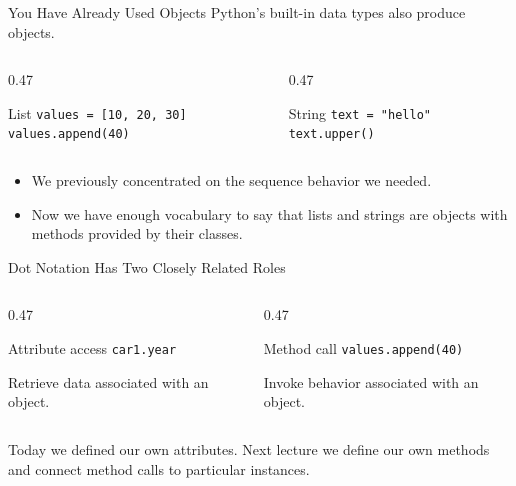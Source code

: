 \documentclass[aspectratio=169,10pt]{beamer}
\begin{document}

\begin{frame}{You Have Already Used Objects}
  Python's built-in data types also produce objects.

  \begin{columns}[T,onlytextwidth]
    \begin{column}{0.47\textwidth}
      \begin{block}{List}
        \texttt{values = [10, 20, 30]}\\
        \texttt{values.append(40)}
      \end{block}
    \end{column}
    \begin{column}{0.47\textwidth}
      \begin{block}{String}
        \texttt{text = "hello"}\\
        \texttt{text.upper()}
      \end{block}
    \end{column}
  \end{columns}

  \begin{itemize}
    \item We previously concentrated on the sequence behavior we needed.
    \item Now we have enough vocabulary to say that lists and strings are objects with methods provided by their classes.
  \end{itemize}
\end{frame}

\begin{frame}{Dot Notation Has Two Closely Related Roles}
  \begin{columns}[T,onlytextwidth]
    \begin{column}{0.47\textwidth}
      \begin{block}{Attribute access}
        \texttt{car1.year}
      \end{block}
      Retrieve data associated with an object.
    \end{column}
    \begin{column}{0.47\textwidth}
      \begin{block}{Method call}
        \texttt{values.append(40)}
      \end{block}
      Invoke behavior associated with an object.
    \end{column}
  \end{columns}

  \begin{keyidea}
    Today we defined our own attributes. Next lecture we define our own methods and connect method calls to particular instances.
  \end{keyidea}
\end{frame}
\end{document}

